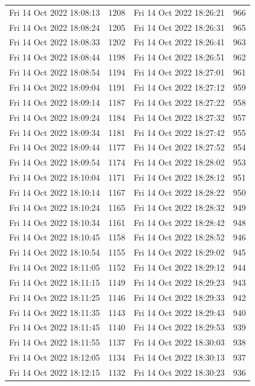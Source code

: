 \documentclass[12pt]{ctexart}
\numberwithin{equation}{section}
\begin{document}
\begin{longtable}{cc|cc}
Fri 14 Oct 2022 18:08:13 & 1208 & Fri 14 Oct 2022 18:26:21 & 966 \\
Fri 14 Oct 2022 18:08:24 & 1205 & Fri 14 Oct 2022 18:26:31 & 965 \\
Fri 14 Oct 2022 18:08:33 & 1202 & Fri 14 Oct 2022 18:26:41 & 963 \\
Fri 14 Oct 2022 18:08:44 & 1198 & Fri 14 Oct 2022 18:26:51 & 962 \\
Fri 14 Oct 2022 18:08:54 & 1194 & Fri 14 Oct 2022 18:27:01 & 961 \\
Fri 14 Oct 2022 18:09:04 & 1191 & Fri 14 Oct 2022 18:27:12 & 959 \\
Fri 14 Oct 2022 18:09:14 & 1187 & Fri 14 Oct 2022 18:27:22 & 958 \\
Fri 14 Oct 2022 18:09:24 & 1184 & Fri 14 Oct 2022 18:27:32 & 957 \\
Fri 14 Oct 2022 18:09:34 & 1181 & Fri 14 Oct 2022 18:27:42 & 955 \\
Fri 14 Oct 2022 18:09:44 & 1177 & Fri 14 Oct 2022 18:27:52 & 954 \\
Fri 14 Oct 2022 18:09:54 & 1174 & Fri 14 Oct 2022 18:28:02 & 953 \\
Fri 14 Oct 2022 18:10:04 & 1171 & Fri 14 Oct 2022 18:28:12 & 951 \\
Fri 14 Oct 2022 18:10:14 & 1167 & Fri 14 Oct 2022 18:28:22 & 950 \\
Fri 14 Oct 2022 18:10:24 & 1165 & Fri 14 Oct 2022 18:28:32 & 949 \\
Fri 14 Oct 2022 18:10:34 & 1161 & Fri 14 Oct 2022 18:28:42 & 948 \\
Fri 14 Oct 2022 18:10:45 & 1158 & Fri 14 Oct 2022 18:28:52 & 946 \\
Fri 14 Oct 2022 18:10:54 & 1155 & Fri 14 Oct 2022 18:29:02 & 945 \\
Fri 14 Oct 2022 18:11:05 & 1152 & Fri 14 Oct 2022 18:29:12 & 944 \\
Fri 14 Oct 2022 18:11:15 & 1149 & Fri 14 Oct 2022 18:29:23 & 943 \\
Fri 14 Oct 2022 18:11:25 & 1146 & Fri 14 Oct 2022 18:29:33 & 942 \\
Fri 14 Oct 2022 18:11:35 & 1143 & Fri 14 Oct 2022 18:29:43 & 940 \\
Fri 14 Oct 2022 18:11:45 & 1140 & Fri 14 Oct 2022 18:29:53 & 939 \\
Fri 14 Oct 2022 18:11:55 & 1137 & Fri 14 Oct 2022 18:30:03 & 938 \\
Fri 14 Oct 2022 18:12:05 & 1134 & Fri 14 Oct 2022 18:30:13 & 937 \\
Fri 14 Oct 2022 18:12:15 & 1132 & Fri 14 Oct 2022 18:30:23 & 936 \\

\end{longtable}
\end{document}
